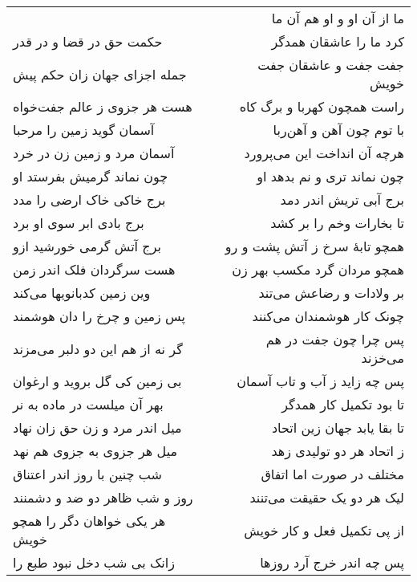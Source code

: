 \begin{center}
\begin{longtable}{l p{0.5cm} r}
&&
ما از آن او و او هم آن ما
\\
حکمت حق در قضا و در قدر
&&
کرد ما را عاشقان همدگر
\\
جمله اجزای جهان زان حکم پیش
&&
جفت جفت و عاشقان جفت خویش
\\
هست هر جزوی ز عالم جفت‌خواه
&&
راست همچون کهربا و برگ کاه
\\
آسمان گوید زمین را مرحبا
&&
با توم چون آهن و آهن‌ربا
\\
آسمان مرد و زمین زن در خرد
&&
هرچه آن انداخت این می‌پرورد
\\
چون نماند گرمیش بفرستد او
&&
چون نماند تری و نم بدهد او
\\
برج خاکی خاک ارضی را مدد
&&
برج آبی تریش اندر دمد
\\
برج بادی ابر سوی او برد
&&
تا بخارات وخم را بر کشد
\\
برج آتش گرمی خورشید ازو
&&
همچو تابهٔ سرخ ز آتش پشت و رو
\\
هست سرگردان فلک اندر زمن
&&
همچو مردان گرد مکسب بهر زن
\\
وین زمین کدبانویها می‌کند
&&
بر ولادات و رضاعش می‌تند
\\
پس زمین و چرخ را دان هوشمند
&&
چونک کار هوشمندان می‌کنند
\\
گر نه از هم این دو دلبر می‌مزند
&&
پس چرا چون جفت در هم می‌خزند
\\
بی زمین کی گل بروید و ارغوان
&&
پس چه زاید ز آب و تاب آسمان
\\
بهر آن میلست در ماده به نر
&&
تا بود تکمیل کار همدگر
\\
میل اندر مرد و زن حق زان نهاد
&&
تا بقا یابد جهان زین اتحاد
\\
میل هر جزوی به جزوی هم نهد
&&
ز اتحاد هر دو تولیدی زهد
\\
شب چنین با روز اندر اعتناق
&&
مختلف در صورت اما اتفاق
\\
روز و شب ظاهر دو ضد و دشمنند
&&
لیک هر دو یک حقیقت می‌تنند
\\
هر یکی خواهان دگر را همچو خویش
&&
از پی تکمیل فعل و کار خویش
\\
زانک بی شب دخل نبود طبع را
&&
پس چه اندر خرج آرد روزها
\\
\end{longtable}
\end{center}
